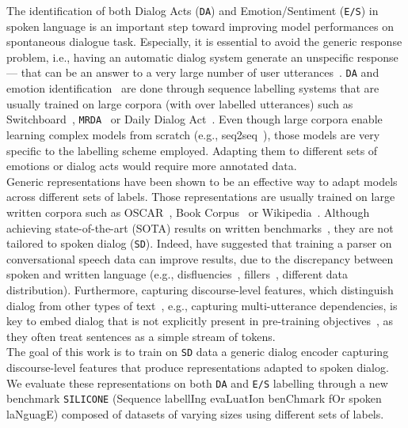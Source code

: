 \documentclass[11pt,a4paper]{article}
\begin{document}
The identification of both Dialog Acts (\texttt{DA}) and Emotion/Sentiment (\texttt{E/S}) in spoken language is an important step toward improving model performances on spontaneous dialogue task.
Especially, it is essential to avoid the generic response problem, i.e., having an automatic dialog system generate an unspecific response --- that can be an answer to a very large number of user utterances~\cite{generic,generic_emo}. \texttt{DA} and emotion identification~\cite{classif,heavy_tailed} are done through sequence labelling systems that are usually trained on large corpora (with over  labelled utterances) such as Switchboard~\cite{datase_swda}, \texttt{MRDA}~\cite{dataset_mrda} or Daily Dialog Act~\cite{dataset_dailydialog}.
Even though large corpora enable learning complex models from scratch (e.g., seq2seq~\cite{colombo2020guiding}), those models are very specific to the labelling scheme employed. Adapting them to different sets of emotions or dialog acts would require more annotated data.\\Generic representations \cite{mikolov2013distributed,pennington2014glove,peters2018deep,bert,xlnet,roberta} have been shown to be an effective way to adapt models across different sets of labels. Those representations are usually trained on large written corpora such as OSCAR~\cite{oscar}, Book Corpus~\cite{book} or Wikipedia~\cite{wiki}. Although achieving state-of-the-art (SOTA) results on written benchmarks~\cite{glue}, they are not tailored to spoken dialog (\texttt{SD}). Indeed, \citet{tran2019role} have suggested that training a parser on conversational speech data can improve results, due to the discrepancy between spoken and written language (e.g., disfluencies~\cite{disfluency}, fillers~\cite{fillers,dinkar2020importance}, different data distribution).
Furthermore, capturing discourse-level features, which distinguish dialog from other types of text~\cite{context}, e.g., capturing multi-utterance dependencies, is key to embed dialog that is not explicitly present in pre-training objectives~\cite{bert,xlnet,roberta}, as they often treat sentences as a simple stream of tokens. \\
The goal of this work is to train on \texttt{SD} data a generic dialog encoder capturing discourse-level features that produce representations adapted to spoken dialog.
We evaluate these representations on both \texttt{DA} and \texttt{E/S} labelling through a new benchmark \texttt{SILICONE} (Sequence labellIng evaLuatIon benChmark fOr spoken laNguagE) composed of datasets of varying sizes using different sets of labels. 
\end{document}
